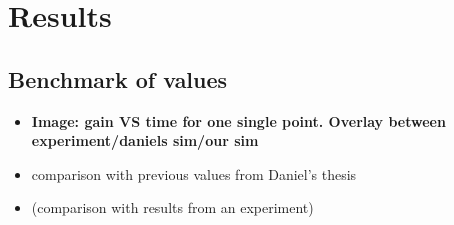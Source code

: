 \section{Results}


\subsection{Benchmark of values}

\begin{itemize}

  \item \textbf{Image: gain VS time for one single point. Overlay between
    experiment/daniels sim/our sim}

  \item comparison with previous values from Daniel's thesis

  \item (comparison with results from an experiment)

\end{itemize}



